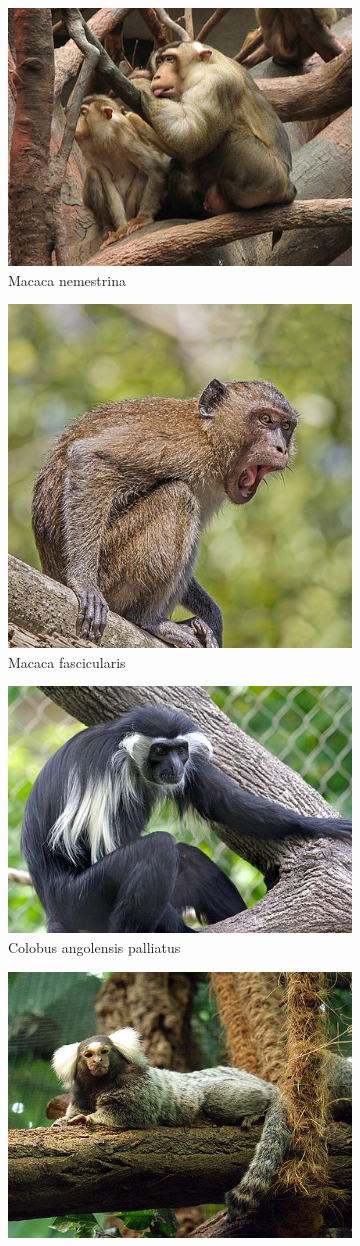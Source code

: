 \documentclass[a4paper, 12pt, one column]{article}
\begin{document}
\begin{figure}[H]
    \begin{subfigure}{.3\textwidth}
        \centering
        \includegraphics[width=.4\linewidth]{Macaca nemestrina.jpeg}
        \caption{Macaca nemestrina}
        \label{fig:Macaca nemestrina}
    \end{subfigure}
    \begin{subfigure}{.3\textwidth}
        \centering
        \includegraphics[width=.4\linewidth]{Macaca fascicularis.jpeg}
        \caption{Macaca fascicularis}
        \label{fig:Macaca fascicularis}
    \end{subfigure}
    \begin{subfigure}{.3\textwidth}
        \centering
        \includegraphics[width=.4\linewidth]{Colobus angolensis palliatus.jpeg}
        \caption{Colobus angolensis palliatus}
        \label{fig:Colobus angolensis palliatus}
    \end{subfigure}
    \begin{subfigure}{.3\textwidth}
        \centering
        \includegraphics[width=.4\linewidth]{Callithrix jacchus.jpeg}

\end{subfigure}
\end{figure}
\end{document}
